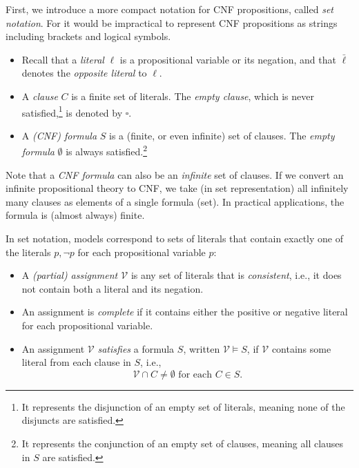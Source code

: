 First, we introduce a more compact notation for CNF propositions, called \emph{set notation}. For it would be impractical to represent CNF propositions as strings including brackets and logical symbols.
\begin{itemize}
    \item Recall that a \emph{literal} $\ell$ is a propositional variable or its negation, and that $\bar{\ell}$ denotes the \emph{opposite literal} to $\ell$.
    \item A \emph{clause} $C$ is a finite set of literals. The \emph{empty clause}, which is never satisfied,\footnote{It represents the disjunction of an empty set of literals, meaning none of the disjuncts are satisfied.} is denoted by $\square$.
    \item A \emph{(CNF) formula} $S$ is a (finite, or even infinite) set of clauses. The \emph{empty formula} $\emptyset$ is always satisfied.\footnote{It represents the conjunction of an empty set of clauses, meaning all clauses in $S$ are satisfied.}
\end{itemize}

\begin{remark}
    Note that a \emph{CNF formula} can also be an \emph{infinite} set of clauses. If we convert an infinite propositional theory to CNF, we take (in set representation) all infinitely many clauses as elements of a single formula (set). In practical applications, the formula is (almost always) finite.
\end{remark}

In set notation, models correspond to sets of literals that contain exactly one of the literals $p, \neg p$ for each propositional variable $p$:
\begin{itemize}
    \item A \emph{(partial) assignment $\mathcal{V}$} is any set of literals that is \emph{consistent}, i.e., it does not contain both a literal and its negation.
    \item An assignment is \emph{complete} if it contains either the positive or negative literal for each propositional variable.
    \item An assignment $\mathcal{V}$ \emph{satisfies} a formula $S$, written $\mathcal{V} \models S$, if $\mathcal{V}$ contains some literal from each clause in $S$, i.e.,
    $$
    \mathcal{V} \cap C \neq \emptyset \text{ for each } C \in S.
    $$
\end{itemize}

